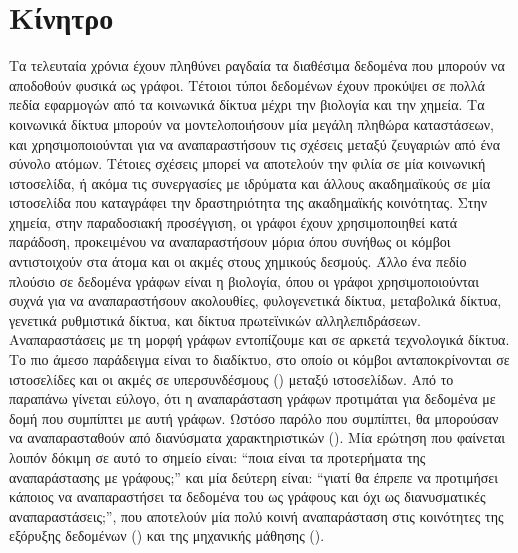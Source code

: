 \section{Κίνητρο}
Τα τελευταία χρόνια έχουν πληθύνει ραγδαία τα διαθέσιμα δεδομένα που μπορούν να αποδοθούν φυσικά ως γράφοι.
Τέτοιοι τύποι δεδομένων έχουν προκύψει σε πολλά πεδία εφαρμογών από τα κοινωνικά δίκτυα μέχρι την βιολογία και την χημεία. Τα κοινωνικά δίκτυα μπορούν να μοντελοποιήσουν μία μεγάλη πληθώρα καταστάσεων, και χρησιμοποιούνται για να αναπαραστήσουν τις σχέσεις μεταξύ ζευγαριών από ένα σύνολο ατόμων.
Τέτοιες σχέσεις μπορεί να αποτελούν την φιλία σε μία κοινωνική ιστοσελίδα, ή ακόμα τις συνεργασίες με ιδρύματα και άλλους ακαδημαϊκούς σε μία ιστοσελίδα που καταγράφει την δραστηριότητα της ακαδημαϊκής κοινότητας.
Στην χημεία, στην παραδοσιακή προσέγγιση, οι γράφοι έχουν χρησιμοποιηθεί κατά παράδοση, προκειμένου να αναπαραστήσουν μόρια όπου συνήθως οι κόμβοι αντιστοιχούν στα άτομα και οι ακμές στους χημικούς δεσμούς.
Άλλο ένα πεδίο πλούσιο σε δεδομένα γράφων είναι η βιολογία, όπου οι γράφοι χρησιμοποιούνται συχνά για να αναπαραστήσουν  ακολουθίες, φυλογενετικά δίκτυα, μεταβολικά δίκτυα, γενετικά ρυθμιστικά δίκτυα, και δίκτυα πρωτεϊνικών αλληλεπιδράσεων.
Αναπαραστάσεις με τη μορφή γράφων εντοπίζουμε και σε αρκετά τεχνολογικά δίκτυα.
Το πιο άμεσο παράδειγμα είναι το διαδίκτυο, στο οποίο οι κόμβοι ανταποκρίνονται σε ιστοσελίδες και οι ακμές σε υπερσυνδέσμους () μεταξύ ιστοσελίδων. Από το παραπάνω γίνεται εύλογο, ότι η αναπαράσταση γράφων προτιμάται για δεδομένα με δομή που συμπίπτει με αυτή γράφων. Ωστόσο παρόλο που συμπίπτει, θα μπορούσαν να αναπαρασταθούν από διανύσματα χαρακτηριστικών (). Μία ερώτηση που φαίνεται λοιπόν δόκιμη σε αυτό το σημείο είναι: ``ποια είναι τα προτερήματα της αναπαράστασης με γράφους;'' και μία δεύτερη είναι: ``γιατί θα έπρεπε να προτιμήσει κάποιος να αναπαραστήσει τα δεδομένα του ως γράφους και όχι ως διανυσματικές αναπαραστάσεις;'', που αποτελούν μία πολύ κοινή αναπαράσταση στις κοινότητες της εξόρυξης δεδομένων () και της μηχανικής μάθησης ().
